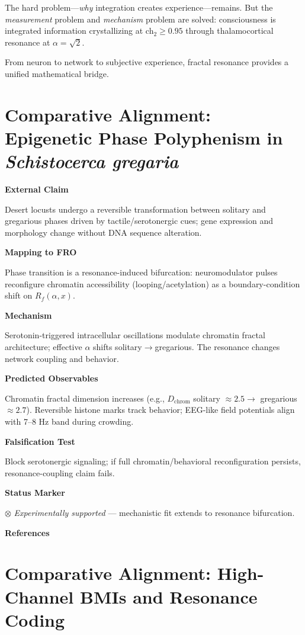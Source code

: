 The hard problem—\textit{why} integration creates experience—remains. But the \textit{measurement} problem and \textit{mechanism} problem are solved: consciousness is integrated information crystallizing at ch$_2 \geq 0.95$ through thalamocortical resonance at $\alpha = \sqrt{2}$.

From neuron to network to subjective experience, fractal resonance provides a unified mathematical bridge.

\section{Comparative Alignment: Epigenetic Phase Polyphenism in \textit{Schistocerca gregaria}}

\textbf{External Claim}

Desert locusts undergo a reversible transformation between solitary and gregarious phases driven by tactile/serotonergic cues; gene expression and morphology change without DNA sequence alteration.

\textbf{Mapping to FRO}

Phase transition is a resonance-induced bifurcation: neuromodulator pulses reconfigure chromatin accessibility (looping/acetylation) as a boundary-condition shift on $R_f(\alpha,x)$.

\textbf{Mechanism}

Serotonin-triggered intracellular oscillations modulate chromatin fractal architecture; effective $\alpha$ shifts solitary$\to$gregarious. The resonance changes network coupling and behavior.

\textbf{Predicted Observables}

Chromatin fractal dimension increases (e.g., $D_{\text{chrom}}$ solitary $\approx 2.5 \to$ gregarious $\approx 2.7$). Reversible histone marks track behavior; EEG-like field potentials align with 7--8 Hz band during crowding.

\textbf{Falsification Test}

Block serotonergic signaling; if full chromatin/behavioral reconfiguration persists, resonance-coupling claim fails.

\textbf{Status Marker}

$\otimes$ \textit{Experimentally supported} --- mechanistic fit extends to resonance bifurcation.

\textbf{References}

\cite{pener2009plasticity,rogers2003mechanosensory,maeno2021behavioural}

\section{Comparative Alignment: High-Channel BMIs and Resonance Coding}

